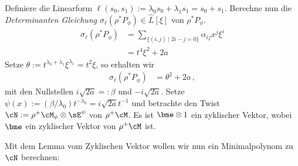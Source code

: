 Definiere die Linearform $\ell(s_0,s_1):=\lambda_0s_0+\lambda_1s_1=s_0+s_1$.
Berechne nun die \emph{Determinanten Gleichung}
$\sigma_\ell(\rho^*P_{\phi})\in \hat L[\xi]$ von $\rho^*P_{\phi}$.
\begin{align*}
\sigma_\ell(\rho^*P_{\phi})
  &= \sum_{\{(i,j)\mid 2i-j=0\}}\alpha_{ij}x^{j}\xi^i\\
  &= t^4\xi^2 + 2a
\end{align*}
Setze $\theta:=t^{\lambda_0+\lambda_1}\xi^{\lambda_1}=t^2\xi$, so erhalten wir
\begin{align*}
\sigma_\ell(\rho^*P_{\phi}) &= \theta^2 + 2a \,,
\end{align*}
mit den Nullstellen $i\sqrt{2a}=:\beta$ und $-i\sqrt{2a}$.
Setze $\psi(x):=(\beta/\lambda_0)t^{-\lambda_0}=i\sqrt{2a}t^{-1}$ und
betrachte den Twist $\cN:=\rho^+\cM_{\phi}\otimes\sE^\psi$ von
$\rho^+\cM$.
Es ist $\bme\otimes 1$ ein zyklischer Vektor, wobei $\bme$ ein zyklischer
Vektor von $\rho^+\cM$ ist.
\iffalse
  Somit existieren $a_0(t)$ und $a_1(t)$ in $\hat L$, so dass
  \[
  0=\partial_t^2 (\bme\otimes 1) + (a_1(t)\partial_t + a_0(t)) \bme\otimes 1
  \]
  und damit ist dann $\cN=\cD/\cD\cdot(\partial_t^2+a_1(t)\partial_t+a_0(t))$.
\fi
Mit dem Lemma vom Zyklischen Vektor wollen wir nun ein Minimalpolynom zu $\cN$
berechnen:
